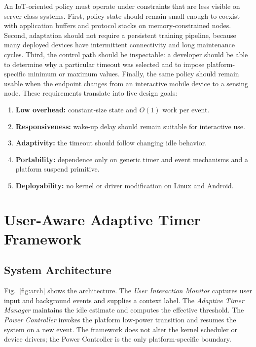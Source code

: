 \documentclass[journal]{IEEEtran}
\begin{document}
An IoT-oriented policy must operate under constraints that are less visible on server-class systems. First, policy state should remain small enough to coexist with application buffers and protocol stacks on memory-constrained nodes. Second, adaptation should not require a persistent training pipeline, because many deployed devices have intermittent connectivity and long maintenance cycles. Third, the control path should be inspectable: a developer should be able to determine why a particular timeout was selected and to impose platform-specific minimum or maximum values. Finally, the same policy should remain usable when the endpoint changes from an interactive mobile device to a sensing node. These requirements translate into five design goals:
\begin{enumerate}
    \item \textbf{Low overhead:} constant-size state and $O(1)$ work per event.
    \item \textbf{Responsiveness:} wake-up delay should remain suitable for interactive use.
    \item \textbf{Adaptivity:} the timeout should follow changing idle behavior.
    \item \textbf{Portability:} dependence only on generic timer and event mechanisms and a platform suspend primitive.
    \item \textbf{Deployability:} no kernel or driver modification on Linux and Android.
\end{enumerate}

\section{User-Aware Adaptive Timer Framework}
\subsection{System Architecture}
Fig.~\ref{fig:arch} shows the architecture. The \emph{User Interaction Monitor} captures user input and background events and supplies a context label. The \emph{Adaptive Timer Manager} maintains the idle estimate and computes the effective threshold. The \emph{Power Controller} invokes the platform low-power transition and resumes the system on a new event. The framework does not alter the kernel scheduler or device drivers; the Power Controller is the only platform-specific boundary.
\end{document}

